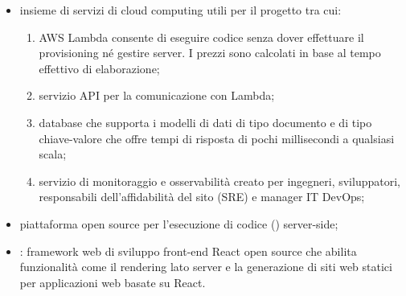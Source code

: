\begin{itemize}
\item {} insieme di servizi di cloud computing utili per il progetto tra cui:
\begin{enumerate}
\item {} AWS Lambda consente di eseguire codice senza dover effettuare il provisioning né gestire server. I prezzi sono calcolati in base al tempo effettivo di elaborazione;
\item {} servizio API per la comunicazione con Lambda;
\item {} database che supporta i modelli di dati di tipo documento e di tipo chiave-valore che offre tempi di risposta di pochi millisecondi a qualsiasi scala;
\item {} servizio di monitoraggio e osservabilità creato per ingegneri, sviluppatori, responsabili dell'affidabilità del sito (SRE) e manager IT DevOps;
\end{enumerate}
\item {} piattaforma open source per l'esecuzione di codice  () server-side;
\item {}: framework web di sviluppo front-end React open source che abilita funzionalità come il rendering lato server e la generazione di siti web statici per applicazioni web basate su React. 
\end{itemize}
